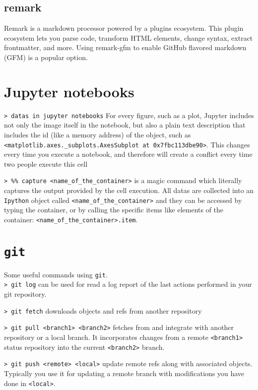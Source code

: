 \documentclass[11pt]{article}
\newcommand{\cmd}[1]{\colorbox{light-gray}{\textcolor{gio}{\texttt{#1}}}}
\begin{document}
\begin{multicols}{2}
\subsection{remark}

Remark is a markdown processor powered by a plugins ecosystem. This plugin ecosystem 
lets you parse code, transform HTML elements, change syntax, extract frontmatter, 
and more. Using remark-gfm to enable GitHub flavored markdown (GFM) is a popular option.

\section{Jupyter notebooks}

\cmd{> datas in jupyter notebooks} For every figure, such as a plot, Jupyter 
includes not only the image itself in the notebook, but also a plain text description 
that includes the id (like a memory address) of the object, such as 
\texttt{<matplotlib.axes.\_subplots.AxesSubplot at 0x7fbc113dbe90>}. 
This changes every time you execute a notebook, and therefore will create a 
conflict every time two people execute this cell

\cmd{> \%\% capture <name\_of\_the\_container>} is a magic command which literally 
captures the output provided by the cell execution. All datas are collected into 
an \texttt{Ipython} object called \texttt{<name\_of\_the\_container>} and they 
can be accessed by typing the container, or by calling the specific items like
 elements of the container: \texttt{<name\_of\_the\_container>.item}. 


\section{\texttt{git}}

Some useful commands using \texttt{git}. \\

\cmd{> git log} can be used for read a log report of the last actions performed
in your git repository.

\cmd{> git fetch} downloads objects and refs from another repository

\cmd{> git pull <branch1> <branch2>} fetches from and integrate with another 
repository or a local branch. It incorporates changes from a remote \texttt{<branch1>} 
status repository into the current \texttt{<branch2>} branch.

\cmd{> git push <remote> <local>} update remote refs along with associated objects. 
Typically you use it for updating a remote branch with modifications you have done 
in \texttt{<local>}.


\end{multicols}
\end{document}
